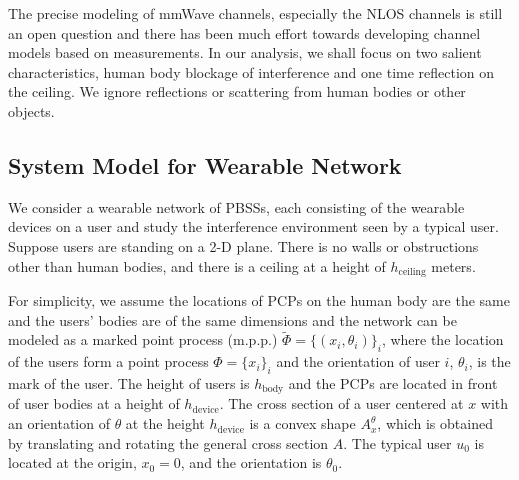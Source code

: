 \documentclass[10pt, conference, letterpaper]{IEEEtran}
\begin{document}
The precise modeling of mmWave channels, especially the NLOS channels is still an open question and there has been much effort towards developing channel models based on measurements. In our analysis, we shall focus on two salient characteristics, human body blockage of interference and one time reflection on the ceiling. We ignore reflections or scattering from human bodies or other objects.

\subsection{System Model for Wearable Network}
We consider a wearable network of PBSSs, each consisting of the wearable devices on a user and study the interference environment seen by a typical user. Suppose users are standing on a 2-D plane. There is no walls or obstructions other than human bodies, and there is a ceiling at a height of $h_{\mathrm{ceiling}}$ meters. 

For simplicity, we assume the locations of PCPs on the human body are the same and the users' bodies are of the same dimensions and the network can be modeled as a marked point process (m.p.p.) $\tilde{\Phi}=\{(x_i, \theta_i)\}_i$, where the location of the users form a point process $\Phi=\{x_i\}_i$ and the orientation of user $i$, $\theta_i$, is the mark of the user. The height of users is $h_{\mathrm{body}}$ and the PCPs are located in front of user bodies at a height of $h_{\mathrm{device}}$. The cross section of a user centered at $x$ with an orientation of $\theta$ at the height $h_{\mathrm{device}}$ is a convex shape $A_x^{\theta}$, which is obtained by translating and rotating the general cross section $A$. The typical user $u_0$ is located at the origin, $x_0=0$, and the orientation is $\theta_0$.
\end{document}
